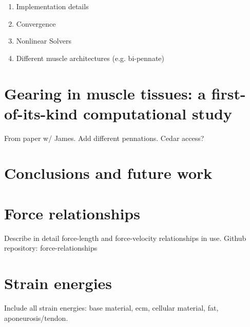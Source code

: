 \documentclass{sfuthesis}
\numberwithin{equation}{chapter}
\numberwithin{figure}{chapter}
\numberwithin{table}{chapter}
\theoremstyle{definition}
\begin{document}
\begin{enumerate}
    \item Implementation details
    \item Convergence
    \item Nonlinear Solvers
    \item Different muscle architectures (e.g. bi-pennate)
\end{enumerate}

\chapter{Gearing in muscle tissues: a first-of-its-kind computational study}

From paper w/ James. Add different pennations. Cedar access?



\chapter{Conclusions and future work}


%
%
%
%
%

\backmatter%
    
    

\begin{appendices} %

\chapter{Force relationships} \label{app:force_relationships}

Describe in detail force-length and force-velocity relationships in use.
Github repository: force-relationships

\chapter{Strain energies}

Include all strain energies: base material, ecm, cellular material, fat, aponeurosis/tendon.

\end{appendices}
\end{document}

